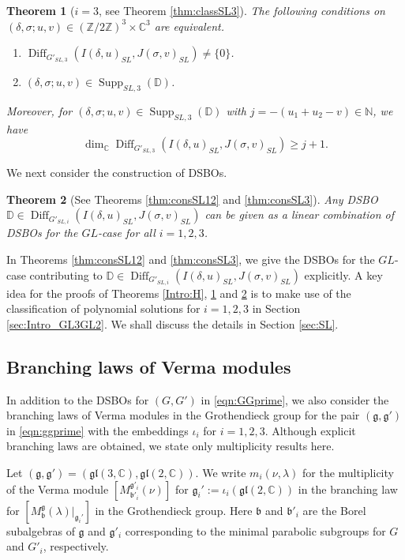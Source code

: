 \documentclass[a4paper,11pt,reqno]{amsart}
\newcommand{\frakg}{\mathfrak{g}}
\newcommand{\DD}{\mathbb{D}}
\newcommand{\0}{{\bf 0}}
\newcommand{\N}{\mathbb{N}}
\newcommand{\Z}{\mathbb{Z}}
\newcommand{\C}{\mathbb{C}}
\newcommand{\1}{{\bf 1}}
\newcommand{\frakb}{{\mathfrak b}}
\DeclareMathOperator{\Supp}{Supp}
\DeclareMathOperator{\Diff}{Diff}
\newcommand{\Mb}{M^{\frakg}_{\frakb}}
\theoremstyle{plain}
\newtheorem{thmalph}{Theorem}
\theoremstyle{definition}
\numberwithin{equation}{section}
\theoremstyle{definition}
\begin{document}
\begin{thmalph}
[{$i=3$, see Theorem \ref{thm:classSL3}}]
\label{Intro:I}
The following conditions on 
$(\delta,\sigma; u, v)  \in (\Z/2\Z)^3\times \C^3$ are equivalent.
\begin{enumerate}[label=\normalfont{(\roman*)}]
\item $\Diff_{G'_{SL,3}}(I(\delta,u)_{SL}, J(\sigma,v)_{SL})\neq \{0\}$.
\item $(\delta,\sigma; u, v) \in \Supp_{SL,3}(\DD)$.
\end{enumerate}
Moreover, for $(\delta,\sigma; u, v)  \in \Supp_{SL,3}(\DD)$ with $j=-(u_1+u_2-v)\in\N$,
we have
\begin{equation*}
\dim_\C\Diff_{G'_{SL,3}}(I(\delta,u)_{SL}, J(\sigma,v)_{SL}) \geq j+1.
\end{equation*}
\end{thmalph}

We next consider the construction of DSBOs. 

\begin{thmalph}
[{See Theorems \ref{thm:consSL12} and \ref{thm:consSL3}}]
\label{Intro:J}
Any DSBO $\DD \in \Diff_{G'_{SL,i}}(I(\delta,u)_{SL}, J(\sigma,v)_{SL})$
can be given as a linear combination of DSBOs 
for the $GL$-case for all $i=1,2,3$.
\end{thmalph}

In Theorems \ref{thm:consSL12} and \ref{thm:consSL3}, 
we give the DSBOs for the $GL$-case contributing to 
$\DD \in \Diff_{G'_{SL,i}}(I(\delta,u)_{SL}, J(\sigma,v)_{SL})$ explicitly.
A key idea for the proofs of Theorems \ref{Intro:H}, \ref{Intro:I} and \ref{Intro:J} is 
to make use of the classification of polynomial solutions for $i=1,2,3$ in
Section \ref{sec:Intro_GL3GL2}. We shall discuss the details in Section \ref{sec:SL}.

\subsection{Branching laws of Verma modules}

In addition to the DSBOs for $(G,G')$ in \eqref{eqn:GGprime}, we also consider 
the branching laws of Verma modules in the Grothendieck group for the pair 
$(\frakg,\frakg')$ in \eqref{eqn:ggprime} with the embeddings $\iota_i$ for $i=1,2,3$.
Although explicit branching laws are obtained, 
we state only multiplicity results here.

Let $(\frakg,\frakg')=(\mathfrak{gl}(3,\C), \mathfrak{gl}(2,\C))$.
We write $m_i(\nu,\lambda)$ for the multiplicity of the Verma module
$[M^{\frakg'_i}_{\frakb'_i}(\nu)]$
for $\frakg_i':=\iota_i(\mathfrak{gl}(2,\C))$ in the branching law
for $[\Mb(\lambda)\vert_{\frakg_i'}]$ in the Grothendieck group.
Here $\frakb$ and $\frakb'_i$ are the Borel subalgebras of $\frakg$ and $\frakg'_i$
corresponding to the minimal parabolic subgroups for $G$ and $G'_i$, respectively.
\end{document}
